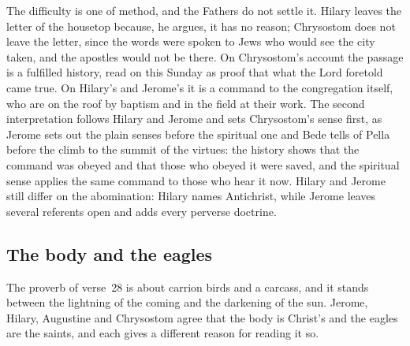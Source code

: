 The difficulty is one of method, and the Fathers do not settle it. Hilary
leaves the letter of the housetop because, he argues, it has no reason;
Chrysostom does not leave the letter, since the words were spoken to Jews who
would see the city taken, and the apostles would not be there. On
Chrysostom's account the passage is a fulfilled history, read on this Sunday
as proof that what the Lord foretold came true. On Hilary's and Jerome's it is
a command to the congregation itself, who are on the roof by baptism and in
the field at their work. The second interpretation follows Hilary and Jerome
and sets Chrysostom's sense first, as Jerome sets out the plain senses before
the spiritual one and Bede tells of Pella before the climb to the summit of
the virtues: the history shows that the command was obeyed and that those who
obeyed it were saved, and the spiritual sense applies the same command to
those who hear it now. Hilary and Jerome still differ on the abomination:
Hilary names Antichrist, while Jerome leaves several referents open and adds
every perverse doctrine.

\subsection{The body and the eagles}

The proverb of verse~28 is about carrion birds and a carcass, and it stands
between the lightning of the coming and the darkening of the sun. Jerome,
Hilary, Augustine and Chrysostom agree that the body is Christ's and the
eagles are the saints, and each gives a different reason for reading it so.

